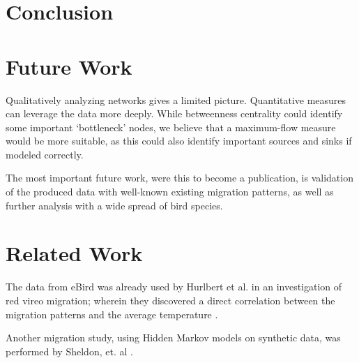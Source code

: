 \documentclass{article} %
\begin{document}
\section{Conclusion}

\section{Future Work}
Qualitatively analyzing networks gives a limited picture. Quantitative measures can leverage the data more deeply. While betweenness centrality could identify some important `bottleneck' nodes, we believe that a maximum-flow measure would be more suitable, as this could also identify important sources and sinks if modeled correctly.

The most important future work, were this to become a publication, is validation of the produced data with well-known existing migration patterns, as well as further analysis with a wide spread of bird species.

\section{Related Work}
The data from eBird was already used by Hurlbert et al. in an investigation of red vireo migration; wherein they discovered a direct correlation between the migration patterns and the average temperature \cite{hurlbert}. 

Another migration study, using Hidden Markov models on synthetic data, was performed by Sheldon, et. al \cite{conf/nips/SheldonEK07}. 



\end{document}
